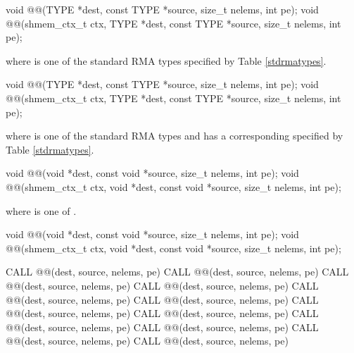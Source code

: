 
\begin{apidefinition}

\begin{C11synopsis}
void @@(TYPE *dest, const TYPE *source, size_t nelems, int pe);
void @@(shmem_ctx_t ctx, TYPE *dest, const TYPE *source, size_t nelems, int pe);
\end{C11synopsis}
where \TYPE{} is one of the standard \ac{RMA} types specified by Table \ref{stdrmatypes}.

\begin{Csynopsis}
void @@(TYPE *dest, const TYPE *source, size_t nelems, int pe);
void @@(shmem_ctx_t ctx, TYPE *dest, const TYPE *source, size_t nelems, int pe);
\end{Csynopsis}
where \TYPE{} is one of the standard \ac{RMA} types and has a corresponding \TYPENAME{} specified by Table \ref{stdrmatypes}.

\begin{CsynopsisCol}
void @@(void *dest, const void *source, size_t nelems, int pe);
void @@(shmem_ctx_t ctx, void *dest, const void *source, size_t nelems, int pe);
\end{CsynopsisCol}
where \SIZE{} is one of .

\begin{CsynopsisCol}
void @@(void *dest, const void *source, size_t nelems, int pe);
void @@(shmem_ctx_t ctx, void *dest, const void *source, size_t nelems, int pe);
\end{CsynopsisCol}

\begin{Fsynopsis}
CALL @@(dest, source, nelems, pe)
CALL @@(dest, source, nelems, pe)
CALL @@(dest, source, nelems, pe)
CALL @@(dest, source, nelems, pe)
CALL @@(dest, source, nelems, pe)
CALL @@(dest, source, nelems, pe)
CALL @@(dest, source, nelems, pe)
CALL @@(dest, source, nelems, pe)
CALL @@(dest, source, nelems, pe)
CALL @@(dest, source, nelems, pe)
CALL @@(dest, source, nelems, pe)
CALL @@(dest, source, nelems, pe)
\end{Fsynopsis}


\end{apidefinition}
